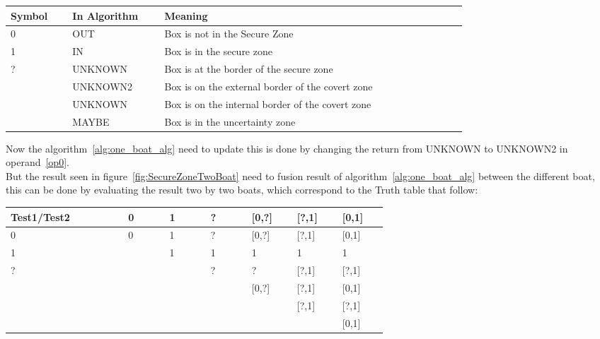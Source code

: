 \begin{center}
\begin{tabular}{|m{0.10\linewidth}|m{0.15\linewidth}|m{0.5\linewidth}|}
\hline
 Symbol & In Algorithm  & Meaning  \\ \hline
 0 & OUT & Box is not in the Secure Zone  \\ \hline
 1 & IN & Box is in the secure zone \\ \hline
 ? & UNKNOWN & Box is at the border of the secure zone  \\ \hline
[0,?]& UNKNOWN2  & Box is on the external border of the covert zone \\ \hline
[?,1]& UNKNOWN  & Box is on the internal border of the covert zone\\ \hline
[0,1]& MAYBE  & Box is in the uncertainty zone\\ \hline
   
\end{tabular}
\end{center}

Now the algorithm~\ref{alg:one_boat_alg} need to update this is done by changing the return from UNKNOWN to UNKNOWN2 in operand~\ref{op0}.\\
But the result seen in figure~\ref{fig:SecureZoneTwoBoat} need to fusion result of algorithm~\ref{alg:one_boat_alg} between the different boat,  this can be done by evaluating the result two by two boats, which correspond to the Truth table that follow:

\begin{center}
\begin{tabular}{|m{0.20\linewidth}|m{0.07\linewidth}|m{0.07\linewidth}|m{0.07\linewidth}|m{0.07\linewidth}|m{0.07\linewidth}|m{0.07\linewidth}|}
\hline
Test1/Test2 & 0 & 1 & ? & [0,?] &  [?,1] & [0,1] \\ \hline
          0 & 0 & 1 & ? & [0,?] &  [?,1] & [0,1]  \\ \hline
          1 &   & 1 & 1 &   1   &    1   &   1  \\ \hline
          ? &   &   & ? &   ?   &  [?,1] & [?,1] \\ \hline
      [0,?] &   &   &   & [0,?] &  [?,1] & [0,1] \\ \hline
      [?,1] &   &   &   &       &  [?,1] & [?,1] \\ \hline
      [0,1] &   &   &   &       &        & [0,1]  \\ \hline   
\end{tabular}
\end{center}

